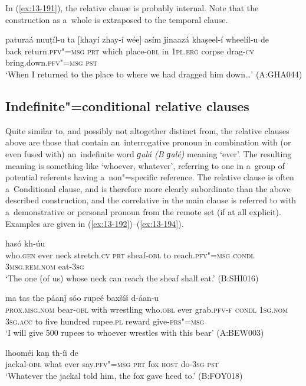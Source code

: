 In (\ref{ex:13-191}), the relative clause is probably internal. Note that the construction as a~whole is extraposed to the temporal clause.

\begin{exe}
\ex
\label{ex:13-191}
\gll paturaá nuuṭíl-u ta [khayí zhay-í wée] asím  ǰinaazá khaṣeel-í wheelíl-u de \\
back return.\textsc{pfv"=msg} \textsc{prt} which place-\textsc{obl} in \textsc{1pl.erg} corpse drag-\textsc{cv}  bring.down.\textsc{pfv"=msg} \textsc{pst}   \\
\glt `When I returned to the place to where we had dragged him down{\ldots}' (A:GHA044)
\end{exe}

\subsection{Indefinite"=conditional relative clauses}
\label{subsec:13-6-2}

Quite similar to, and possibly not altogether distinct from, the relative clauses above are those that contain an~interrogative pronoun in combination with (or even fused with) an~indefinite word \textit{ɡalá} \textit{(B ɡalé)} meaning `ever'. The resulting meaning is something like `whoever, whatever', referring to one in a~group of potential referents having a~non"=specific reference. The relative clause is often a~Conditional clause, and is therefore more clearly subordinate than the above described construction, and the correlative in the main clause is referred to with a~demonstrative or personal pronoun from the remote set (if at all explicit). Examples are given in (\ref{ex:13-192})--(\ref{ex:13-194}).

\begin{exe}
\ex
\label{ex:13-192}
 hasó kh-úu \\
who.\textsc{gen} ever neck stretch.\textsc{cv} \textsc{prt} sheaf-\textsc{obl} to  reach.\textsc{pfv"=msg} \textsc{condl} \textsc{3msg.rem.nom} eat-\textsc{3sg} \\
\glt `The one (of us) whose neck can reach the sheaf shall eat.' (B:SHI016)

\ex
\label{ex:13-193}
 ma tas
the páanǰ sóo rupeé baxšíš  d-áan-u \\
\textsc{prox.msg.nom}{\protect\footnotemark} bear-\textsc{obl} with wrestling who.\textsc{obl} ever grab.\textsc{pfv-f} \textsc{condl} \textsc{1sg.nom} \textsc{3sg.acc} to five hundred rupee.\textsc{pl} reward give-\textsc{prs"=msg} \\
\glt `I will give 500 rupees to whoever wrestles with this bear' (A:BEW003)

\ex
\label{ex:13-194}
 lhooméi kaṇ  th-íi de \\
jackal-\textsc{obl} what ever say.\textsc{pfv"=msg} \textsc{prt} fox \textsc{host} do-\textsc{3sg} \textsc{pst} \\
\glt `Whatever the jackal told him, the fox gave heed to.' (B:FOY018) 
\end{exe}

